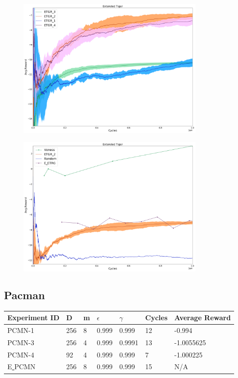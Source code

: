 \documentclass{article}
\theoremstyle{definition}
\newtheorem{primary statistics}[definition]{Primary Statistics}
\newtheorem{auxiliary statistics}[definition]{Auxiliary Statistics}
\begin{document}
 \begin{figure}[h]
 \centering
    \includegraphics[width=9.3cm]{4_Extended_Tiger}
\end{figure}

 \begin{figure}[h]
 \centering
    \includegraphics[width=9.3cm]{Extended_Tiger}
\end{figure}

\newpage

\subsection{Pacman}
 \begin{tabular}{|l|l|l|l|l|l|l|}
 \hline \centering
 Experiment ID& D & m & $\epsilon$ & $\gamma$ & Cycles & Average Reward \\ \hline
PCMN-1  & 256       & 8           & 0.999       & 0.999             & 12     & -0.994        \\ \hline
 PCMN-3    & 256       & 4           & 0.999       & 0.9991            & 13     & -1.0055625       \\ \hline
 PCMN-4     & 92        & 4           & 0.999       & 0.999             & 7      &    -1.000225    \\  \hline 
  E\underline{ }PCMN    & 256        & 8           & 0.999       & 0.999             & 15      &    N/A    \\  \hline     
\end{tabular}
\end{document}
